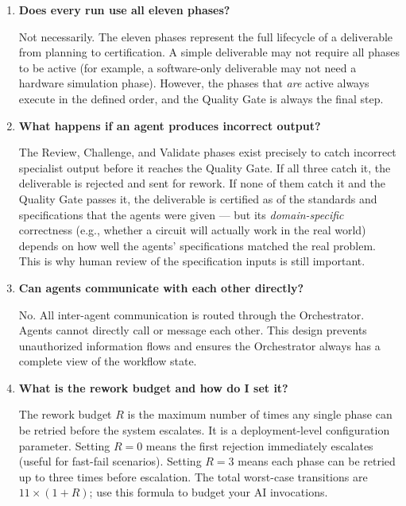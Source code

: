\documentclass[12pt]{article}
\begin{document}
\begin{enumerate}

    \item \textbf{Does every run use all eleven phases?}

          Not necessarily.
          The eleven phases represent the full lifecycle of a
          deliverable from planning to certification.
          A simple deliverable may not require all phases to be
          active (for example, a software-only deliverable may not
          need a hardware simulation phase).
          However, the phases that \emph{are} active always execute
          in the defined order, and the Quality Gate is always the
          final step.

    \item \textbf{What happens if an agent produces incorrect output?}

          The Review, Challenge, and Validate phases exist precisely to
          catch incorrect specialist output before it reaches the
          Quality Gate.
          If all three catch it, the deliverable is rejected and sent
          for rework.
          If none of them catch it and the Quality Gate passes it, the
          deliverable is certified as of the standards and specifications
          that the agents were given --- but its \emph{domain-specific}
          correctness (e.g., whether a circuit will actually work in
          the real world) depends on how well the agents' specifications
          matched the real problem.
          This is why human review of the specification inputs is still
          important.

    \item \textbf{Can agents communicate with each other directly?}

          No.
          All inter-agent communication is routed through the
          Orchestrator.
          Agents cannot directly call or message each other.
          This design prevents unauthorized information flows and
          ensures the Orchestrator always has a complete view of the
          workflow state.

    \item \textbf{What is the rework budget and how do I set it?}

          The rework budget $R$ is the maximum number of times any
          single phase can be retried before the system escalates.
          It is a deployment-level configuration parameter.
          Setting $R = 0$ means the first rejection immediately
          escalates (useful for fast-fail scenarios).
          Setting $R = 3$ means each phase can be retried up to three
          times before escalation.
          The total worst-case transitions are $11 \times (1 + R)$;
          use this formula to budget your AI invocations.


\end{enumerate}
\end{document}
